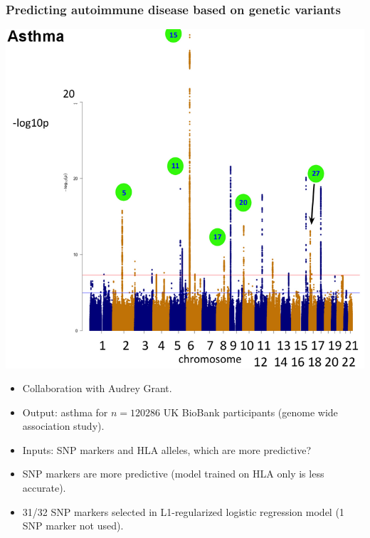 \documentclass{beamer}
\begin{document}
\begin{frame}
  \frametitle{Predicting autoimmune disease based on genetic variants}
  \includegraphics[height=0.4\textheight]{Screenshot-asthma-pvalues}
  \begin{itemize}
  \item Collaboration with Audrey Grant.
  \item Output: asthma for $n=120286$ UK BioBank participants (genome
    wide association study).
  \item Inputs: SNP markers and HLA alleles, which are more
    predictive?
  \item<2> SNP markers are more predictive (model trained on HLA only
    is less accurate).
  \item<2> 31/32 SNP markers selected in L1-regularized logistic
    regression model (1 SNP marker not used).
  \end{itemize}
\end{frame}
\end{document}
